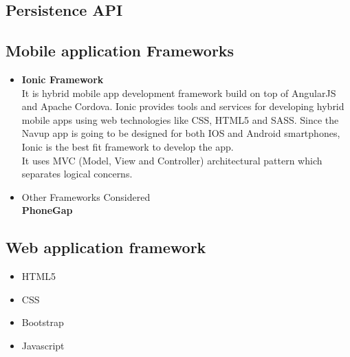 \documentclass{article}
\begin{document}
\subsection{Persistence API}
\subsection{Mobile application Frameworks}
	
	\begin{itemize}	
	
	\item \textbf{Ionic Framework}\\ It is hybrid mobile app development framework build on top of AngularJS and Apache Cordova. Ionic provides tools and services for developing hybrid mobile apps using web technologies like CSS, HTML5 and SASS. Since the Navup app is going to be designed for both IOS and Android smartphones, Ionic is the best fit framework to develop the app. \\
	It uses MVC (Model, View and Controller) architectural pattern which separates logical concerns.
	
	
	\item {Other Frameworks Considered}\\ 
	\textbf{PhoneGap}
	\end{itemize}
	\subsection{Web application framework}
	\begin{itemize}
	\item HTML5
	\item CSS
	\item Bootstrap
	\item Javascript
\end{itemize}
\end{document}
